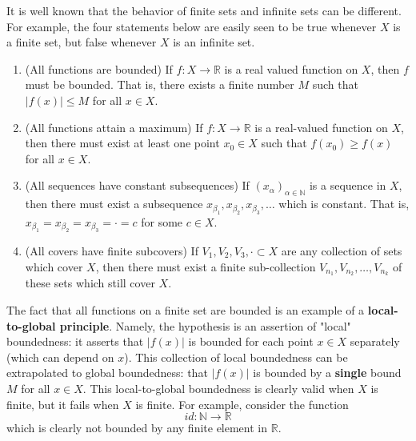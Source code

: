     It is well known that the behavior of finite sets and infinite sets can be different. For example, the four statements below are easily seen to be true whenever $X$ is a finite set, but false whenever $X$ is an infinite set. 
    \begin{enumerate}
      \item (All functions are bounded) If $f: X \rightarrow \mathbb{R}$ is a real valued function on $X$, then $f$ must be bounded. That is, there exists a finite number $M$ such that $|f(x)| \leq M$ for all $x \in X$. 

      \item (All functions attain a maximum) If $f: X \rightarrow \mathbb{R}$ is a real-valued function on $X$, then there must exist at least one point $x_0 \in X$ such that $f(x_0) \geq f(x)$ for all $x \in X$. 

      \item (All sequences have constant subsequences) If $(x_\alpha)_{\alpha \in \mathbb{N}}$ is a sequence in $X$, then there must exist a subsequence $x_{\beta_1}, x_{\beta_2}, x_{\beta_3}, \ldots $ which is constant. That is, $x_{\beta_1} = x_{\beta_2} = x_{\beta_3} = \cdot = c$ for some $c \in X$. 

      \item (All covers have finite subcovers) If $V_1, V_2, V_3, \cdot \subset X$ are any collection of sets which cover $X$, then there must exist a finite sub-collection $V_{n_1}, V_{n_2}, \ldots , V_{n_k}$ of these sets which still cover $X$. 
    \end{enumerate}

    The fact that all functions on a finite set are bounded is an example of a \textbf{local-to-global principle}. Namely, the hypothesis is an assertion of "local" boundedness: it asserts that $|f(x)|$ is bounded for each point $x \in X$ separately (which can depend on $x$). This collection of local boundedness can be extrapolated to global boundedness: that $|f(x)|$ is bounded by a \textbf{single} bound $M$ for all $x \in X$. This local-to-global boundedness is clearly valid when $X$ is finite, but it fails when $X$ is finite. For example, consider the function
    \begin{equation}
      id: \mathbb{N} \rightarrow \mathbb{R}
    \end{equation}
    which is clearly not bounded by any finite element in $\mathbb{R}$. 


